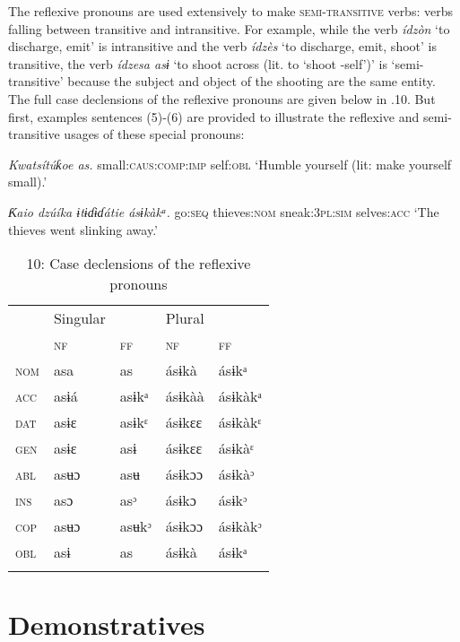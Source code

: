 The reflexive pronouns are used extensively to make \textsc{semi-transitive} verbs: verbs falling between transitive and intransitive. For example, while the verb \textit{ídzòn} ‘to discharge, emit’ is intransitive and the verb \textit{ídzès} ‘to discharge, emit, shoot’ is transitive, the verb \textit{ídzesa asɨ} ‘to shoot across (lit. to ‘shoot -self’)’ is ‘semi-transitive’ because the subject and object of the shooting are the same entity. The full case declensions of the reflexive pronouns are given below in .10. But first, examples sentences (5)-(6) are provided to illustrate the reflexive and semi-transitive usages of these special pronouns:




\textit{Kwatsítúƙoe     as.}
small:\textsc{caus:comp:imp}   self:\textsc{obl}
‘Humble yourself (lit: make yourself small).’




\textit{Ƙ}\textit{aio     dzúíka   ɨtɨɗɨɗátie     ásɨkàkᵃ.}
go:\textsc{seq}   thieves:\textsc{nom}   sneak:\textsc{3pl:sim} selves:\textsc{acc}
‘The thieves went slinking away.’



\begin{table}
\caption{10: Case declensions of the reflexive pronouns}
\label{tab:5}


\begin{tabularx}{\textwidth}{XXXXX} & Singular &  & Plural & \\
\lsptoprule
& \textsc{nf} & \textsc{ff} & \textsc{nf} & \textsc{ff}\\
\textsc{nom} & asa & as & ásɨkà & ásɨkᵃ\\
\textsc{acc} & asɨá & asɨkᵃ & ásɨkàà & ásɨkàkᵃ\\
\textsc{dat} & asɨɛ & asɨkᵋ & ásɨkɛɛ & ásɨkàkᵋ\\
\textsc{gen} & asɨɛ & asɨ & ásɨkɛɛ & ásɨkàᵋ\\
\textsc{abl} & asʉɔ & asʉ & ásɨkɔɔ & ásɨkàᵓ\\
\textsc{ins} & asɔ & asᵓ & ásɨkɔ & ásɨkᵓ\\
\textsc{cop} & asʉɔ & asʉkᵓ & ásɨkɔɔ & ásɨkàkᵓ\\
\textsc{obl} & asɨ & as & ásɨkà & ásɨkᵃ\\
\lspbottomrule
\end{tabularx}
\end{table}


\section{Demonstratives}



